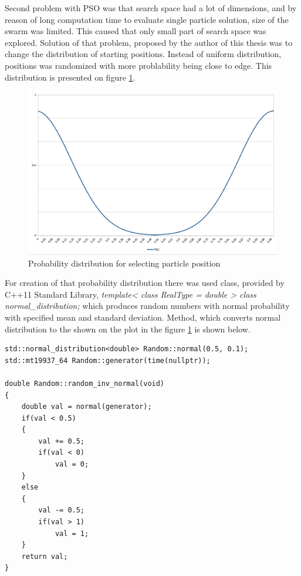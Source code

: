 Second problem with PSO was that search space had a lot of dimensions, and by reason of long computation time to evaluate single particle solution, 
size of the swarm was limited. This caused that only small part of search space was explored. Solution of that problem, 
proposed by the author of this thesis was to change the distribution of starting positions. Instead of uniform distribution, positions was randomized 
with more problability being close to edge. This distribution is presented on figure \ref{img_pso_imp_dist}.

\begin{figure}[ht]
	\centering
	\includegraphics[scale=0.4]{img/pso_dist.png}
	\caption{Probability distribution for selecting particle position}
	\label{img_pso_imp_dist}
\end{figure}

For creation of that probability distribution there was used class, provided by C++11 Standard Library, 
\textit{template< class RealType = double > class normal\_distribution;} which produces random numbers with normal probability
with specified mean and standard deviation. Method, which converts normal distribution to the shown on the plot in the figure \ref{img_pso_imp_dist} 
is shown below.
\vspace{1em}
\begin{lstlisting}
std::normal_distribution<double> Random::normal(0.5, 0.1);
std::mt19937_64 Random::generator(time(nullptr));

double Random::random_inv_normal(void)
{
    double val = normal(generator);
    if(val < 0.5)
    {
        val += 0.5;
        if(val < 0)
            val = 0;
    }
    else
    {
        val -= 0.5;
        if(val > 1)
            val = 1;
    }
    return val;
}
\end{lstlisting}